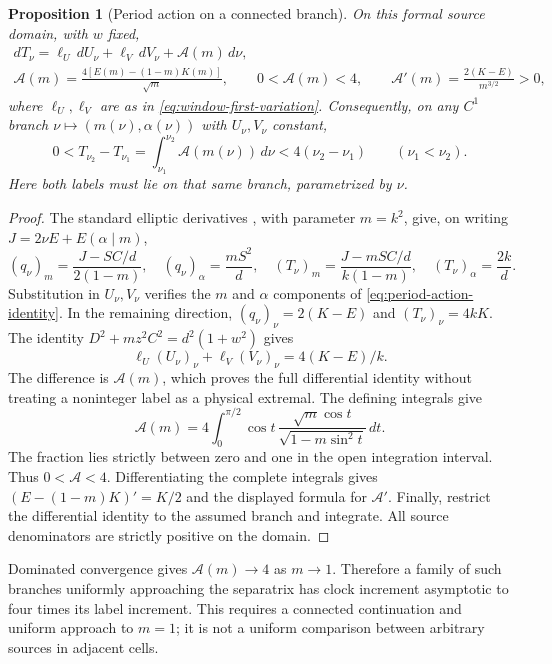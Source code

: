 \documentclass[11pt,a4paper]{article}
\newtheorem{proposition}[theorem]{Proposition}
\theoremstyle{remark}\newtheorem{remark}[theorem]{Remark}
\begin{document}
\begin{proposition}[Period action on a connected branch]
\label{prop:period-action}
On this formal source domain, with $w$ fixed,
\begin{equation}\label{eq:period-action-identity}
 \begin{gathered}
 dT_\nu=\ell_U\,dU_\nu+\ell_V\,dV_\nu+\mathcal A(m)\,d\nu,\\
 \mathcal A(m)=\frac{4[E(m)-(1-m)K(m)]}{\sqrt m},\qquad
 0<\mathcal A(m)<4,\qquad
 \mathcal A'(m)=\frac{2(K-E)}{m^{3/2}}>0,
 \end{gathered}
\end{equation}
where $\ell_U,\ell_V$ are as in \eqref{eq:window-first-variation}.
Consequently, on any $C^1$ branch
$\nu\mapsto(m(\nu),\alpha(\nu))$ with $U_\nu,V_\nu$ constant,
\begin{equation}\label{eq:period-action-gap}
 0<T_{\nu_2}-T_{\nu_1}
   =\int_{\nu_1}^{\nu_2}\mathcal A(m(\nu))\,d\nu
   <4(\nu_2-\nu_1)\qquad(\nu_1<\nu_2).
\end{equation}
Here both labels must lie on that same branch, parametrized by $\nu$.
\end{proposition}
\begin{proof}
The standard elliptic derivatives \cite[Sections 19.2 and 19.4]{DLMF},
with parameter $m=k^2$, give, on writing $J=2\nu E+E(\alpha\mid m)$,
\[
 (q_\nu)_m=\frac{J-SC/d}{2(1-m)},\quad
 (q_\nu)_\alpha=\frac{mS^2}{d},\quad
 (T_\nu)_m=\frac{J-mSC/d}{k(1-m)},\quad
 (T_\nu)_\alpha=\frac{2k}{d}.
\]
Substitution in $U_\nu,V_\nu$ verifies the $m$ and $\alpha$ components
of \eqref{eq:period-action-identity}. In the remaining direction,
$(q_\nu)_\nu=2(K-E)$ and $(T_\nu)_\nu=4kK$. The identity
$D^2+mz^2C^2=d^2(1+w^2)$ gives
\[
 \ell_U(U_\nu)_\nu+\ell_V(V_\nu)_\nu=4(K-E)/k.
\]
The difference is $\mathcal A(m)$, which proves the full differential
identity without treating a noninteger label as a physical extremal.
The defining integrals give
\[
 \mathcal A(m)=4\int_0^{\pi/2}\cos t\,
       \frac{\sqrt m\cos t}{\sqrt{1-m\sin^2t}}\,dt.
\]
The fraction lies strictly between zero and one in the open integration
interval. Thus $0<\mathcal A<4$. Differentiating the complete integrals
gives $(E-(1-m)K)'=K/2$ and the displayed formula for $\mathcal A'$.
Finally, restrict the differential identity to the assumed branch and
integrate. All source denominators are strictly positive on the domain.
\end{proof}

Dominated convergence gives $\mathcal A(m)\to4$ as $m\to1$. Therefore
a family of such branches uniformly approaching the separatrix has
clock increment asymptotic to four times its label increment. This
requires a connected continuation and uniform approach to $m=1$; it
is not a uniform comparison between arbitrary sources in adjacent cells.
\end{document}
